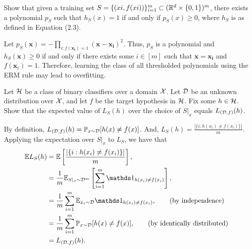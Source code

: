 \begin{problem}{1}
Show that given a training set $S=\{(xi,f(xi))\}_{i=1}^m \subset (\mathbb{R}^d \times \{0,1\})^m$, there exists a polynomial $p_S$ such that
$h_S(x)=1$ if and only if $p_S(x) \geq 0$, where $h_S$ is as defined in Equation (2.3).
\end{problem}
\begin{solution}
    Let $p_S(\bm{x}) = -\prod_{i: f(\bm{x_i}) = 1} (\bm{x} - \bm{x_i})^2$. Thus, $p_S$ is a polynomial and $h_S(\bm{x}) \geq 0$ if and only if there exists some $i \in [m]$ such that $\bm{x} = \bm{x_i}$ and $f(\bm{x}_i) = 1$. Therefore, learning the class of all thresholded polynomials using the ERM rule may lead to overfitting.
\end{solution}


\begin{problem}{2}
Let $\mathcal{H}$ be a class of binary classifiers over a domain $\mathcal{X}$. Let $\mathcal{D}$ be an unknown distribution over $\mathcal{X}$, and let $f$ be the target hypothesis in $\mathcal{H}$. Fix some $h\in\mathcal{H}$. Show that the expected value of $L_S(h)$ over the choice of $S|_x$ equals $L_{(\mathcal{D},f)}(h)$.
\end{problem}
\begin{solution}
    By definition, $L_{(\mathcal{D}, f)}(h) = \mathbb{P}_{x \sim \mathcal{D}}[h(x) \neq f(x)]$. And, $L_S(h) = \frac{|\{i : h(x_i) \neq f(x_i)\}|}{m}$. Applying the expectation over $S|_x$ to $L_S$, we have that 
    \begin{align*}
        \E L_S(h) &= \E\left[\frac{|\{i : h(x_i) \neq f(x_i)\}|}{m}\right] , \\
        &= \frac{1}{m} \E_{S|_x \sim \cD^m}\left[ \sum_{i=1}^m \ind_{h(x_i) \neq f(x_i)}\right], \\
        &= \frac{1}{m} \sum_{i=1}^m \E_{x_i \sim \cD} \ind_{h(x_i) \neq f(x_i)}, \tag{by independence} \\
        &= \frac{1}{m}\sum_{i=1}^m \P_{x \sim \cD}[h(x) \neq f(x)], \tag{by identically distributed} \\
        &= L_{(\cD, f)}(h).
    \end{align*}
\end{solution}

